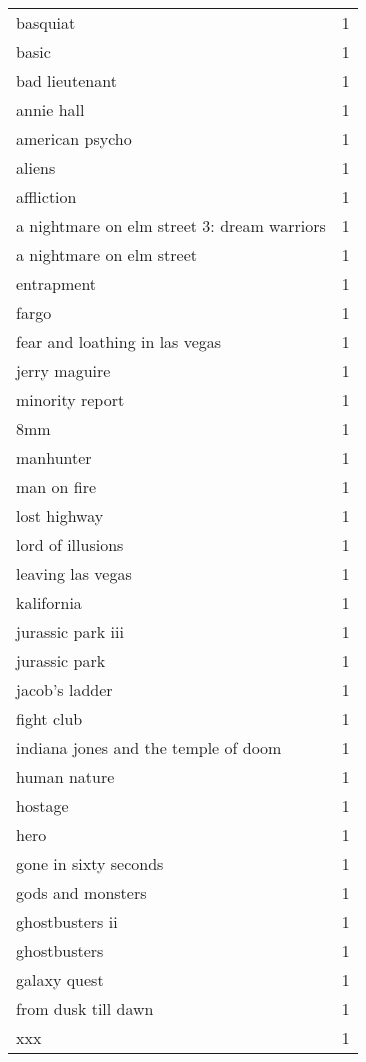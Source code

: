 \begin{tabular}{lr}
basquiat & 1 \\
basic & 1 \\
bad lieutenant & 1 \\
annie hall & 1 \\
american psycho & 1 \\
aliens & 1 \\
affliction & 1 \\
a nightmare on elm street 3: dream warriors & 1 \\
a nightmare on elm street & 1 \\
entrapment & 1 \\
fargo & 1 \\
fear and loathing in las vegas & 1 \\
jerry maguire & 1 \\
minority report & 1 \\
8mm & 1 \\
manhunter & 1 \\
man on fire & 1 \\
lost highway & 1 \\
lord of illusions & 1 \\
leaving las vegas & 1 \\
kalifornia & 1 \\
jurassic park iii & 1 \\
jurassic park & 1 \\
jacob's ladder & 1 \\
fight club & 1 \\
indiana jones and the temple of doom & 1 \\
human nature & 1 \\
hostage & 1 \\
hero & 1 \\
gone in sixty seconds & 1 \\
gods and monsters & 1 \\
ghostbusters ii & 1 \\
ghostbusters & 1 \\
galaxy quest & 1 \\
from dusk till dawn & 1 \\
xxx & 1 \\
\bottomrule
\end{tabular}
